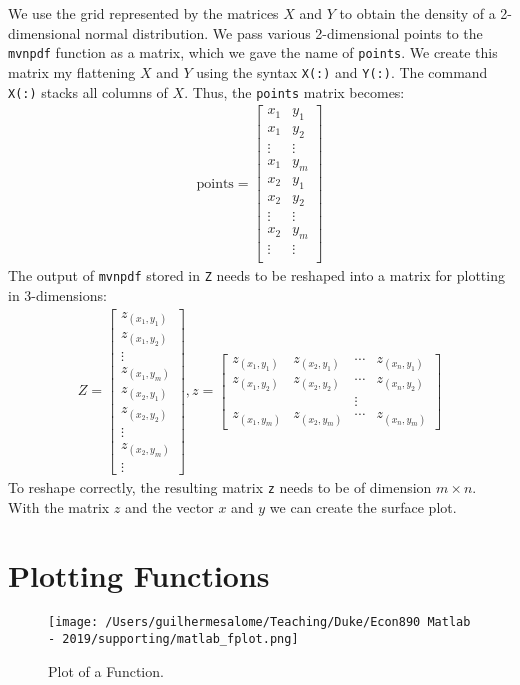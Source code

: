 \documentclass[12pt, a4paper]{article}
\begin{document}
We use the grid represented by the matrices \(X\) and \(Y\) to obtain the density of a 2-dimensional normal distribution.
We pass various 2-dimensional points to the \texttt{mvnpdf} function as a matrix, which we gave the name of \texttt{points}.
We create this matrix my flattening \(X\) and \(Y\) using the syntax \texttt{X(:)} and \texttt{Y(:)}.
The command \texttt{X(:)} stacks all columns of \(X\).
Thus, the \texttt{points} matrix becomes:
\begin{align*}
\text{points} = \begin{bmatrix}
x_1 & y_1\\
x_1 & y_2\\
\vdots&\vdots\\
x_1 & y_m\\
x_2 & y_1\\
x_2 & y_2\\
\vdots&\vdots\\
x_2 & y_m\\
\vdots&\vdots\\
\end{bmatrix}
\end{align*}
The output of \texttt{mvnpdf} stored in \texttt{Z} needs to be reshaped into a matrix for plotting in 3-dimensions:
\begin{align*}
Z = \begin{bmatrix}
z_{(x_1, y_1)}\\
z_{(x_1, y_2)}\\
\vdots\\
z_{(x_1, y_m)}\\
z_{(x_2, y_1)}\\
z_{(x_2, y_2)}\\
\vdots\\
z_{(x_2, y_m)}\\
\vdots
\end{bmatrix}, z= \begin{bmatrix}
z_{(x_1, y_1)} & z_{(x_2, y_1)} & \cdots & z_{(x_n, y_1)}\\
z_{(x_1, y_2)} & z_{(x_2, y_2)} & \cdots & z_{(x_n, y_2)}\\
&& \vdots\\
z_{(x_1, y_m)} & z_{(x_2, y_m)} & \cdots & z_{(x_n, y_m)}
\end{bmatrix}
\end{align*}
To reshape correctly, the resulting matrix \texttt{z} needs to be of dimension \(m \times n\).
With the matrix \(z\) and the vector \(x\) and \(y\) we can create the surface plot.
\section{Plotting Functions}
\label{sec:org96b6866}
\begin{figure}[H]
\centering
\texttt{[image: /Users/guilhermesalome/Teaching/Duke/Econ890 Matlab - 2019/supporting/matlab\_fplot.png]}
\caption{\label{fig:orgd64530d}
Plot of a Function.}
\end{figure}
\end{document}
